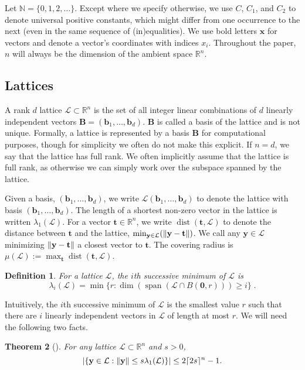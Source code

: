 \documentclass[11pt]{article}
\newtheorem{theorem}{Theorem}[section]
\newtheorem{definition}[theorem]{Definition}
\newcommand{\N}{\ensuremath{\mathbb{N}}}
\newcommand{\R}{\ensuremath{\mathbb{R}}}
\renewcommand{\vec}[1]{\ensuremath{\mathbf{#1}}}
\newcommand{\basis}{\ensuremath{\mathbf{B}}}
\newcommand{\lat}{\mathcal{L}}
\DeclareMathOperator{\dist}{dist}
\DeclareMathOperator{\spn}{span}
\DeclarePairedDelimiter\set{\{}{\}}
\DeclarePairedDelimiter\ceil{\lceil}{\rceil}
\DeclarePairedDelimiter\length{\lVert}{\rVert}
\begin{document}
Let $\N = \{0,1,2,\ldots \}$. Except where we specify otherwise, we use $C$, $C_1$, and $C_2$ to denote universal positive constants, which might differ from one occurrence to the next (even in the same sequence of (in)equalities). We use bold letters $\vec{x}$ for vectors and denote a vector's coordinates with indices $x_i$. Throughout the paper, $n$ will always be the dimension of the ambient space $\R^n$. 


\subsection{Lattices}

A rank $d$ lattice $\lat\subset \R^n$ is the set of all integer linear combinations of $d$ linearly independent vectors $\basis = (\vec{b}_1, \ldots, \vec{b}_d )$. $\basis$ is called a basis of the lattice and is not unique. Formally, a lattice is represented by a basis $\basis$ for computational purposes, though for simplicity we often do not make this explicit. If $n = d$, we say that the lattice has full rank. We often implicitly assume that the lattice is full rank, as otherwise we can simply work over the subspace spanned by the lattice.

Given a basis, $(\vec{b}_1,\ldots, \vec{b}_d)$, we write $\lat(\vec{b}_1,\ldots, \vec{b}_d)$ to denote the lattice with basis $(\vec{b}_1,\ldots, \vec{b}_d)$. The length of a shortest non-zero vector in the lattice is written $\lambda_1(\lat)$. For a vector $\vec{t} \in \R^n$, we write $\dist(\vec{t}, \lat)$ to denote the distance between $\vec{t}$ and the lattice, $\min_{\vec{y} \in \lat}(\length{\vec{y} - \vec{t}})$. We call any $\vec{y} \in \lat$ minimizing $\length{\vec{y} - \vec{t}}$ a closest vector to $\vec{t}$. 
The covering radius is $\mu(\lat) := \max_{\vec{t}} \dist(\vec{t}, \lat)$.

\begin{definition}
For a lattice $\lat$, the $i$th successive minimum of $\lat$ is
\[ \lambda_i(\lat) = \min \{ r : \dim (\spn (\lat \cap B(\vec0, r))) \geq i \}  \;.\]
\end{definition}

Intuitively, the $i$th successive minimum of $\lat$ is the smallest value $r$ such that there are $i$ linearly independent vectors in $\lat$ of length at most $r$. We will need the following two facts.
\begin{theorem}[{\cite[Theorem 2.1]{BHW93}}]
\label{thm:lat-pt-bnd}
For any lattice $\lat \subset \R^n$ and $s > 0$,
\[
|\set{\vec{y} \in \lat: \|\vec{y}\| \leq s \lambda_1(\lat)}| \leq
2\ceil{2s}^n-1 \text{.} \]
\end{theorem}
\end{document}
